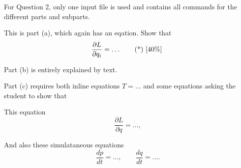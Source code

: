 \qitemsbegin
\item For Question 2, only one input file is used and contains all commands for the different parts and subparts. 

This is part (a), which again has an eqation. Show that
  \begin{equation*}
    \frac{\partial L}{\partial q_i} = \ldots \mtag{40}
  \end{equation*}
\item Part (b) is entirely explained by text. 

\item Part (c) requires both inline equations $T=\ldots$ and some equations asking the student to show that
  \qqitemsbegin
  \item This equation
    \begin{equation*}
      \frac{\partial L}{\partial q} = \ldots,
    \end{equation*}
    \vspace{-12pt}
  \item And also these simulataneous equations
    \begin{equation*}
      \frac{dp}{dt} = \ldots, \qquad \frac{dq}{dt} = \ldots.
    \end{equation*}
  \qqitemsend
\qitemsend